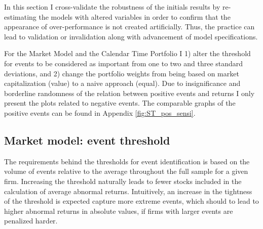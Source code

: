

In this section I cross-validate the robustness of the initials results by re-estimating the models with altered variables in order to confirm that the appearance of over-performance is not created artificially. Thus, the practice can lead to validation or invalidation along with advancement of model specifications. 

For the Market Model and the Calendar Time Portfolio I 1) alter the threshold for events to be considered as important from one to two and three standard deviations, and 2) change the portfolio weights from being based on market capitalization (value) to a naive approach (equal). Due to insignificance and borderline randomness of the relation between positive events and returns I only present the plots related to negative events. The comparable graphs of the positive events can be found in Appendix \ref{fig:ST_pos_sensi}.

\subsection{Market model: event threshold} \label{sec: sens_st_sd}

The requirements behind the thresholds for event identification is based on the volume of events relative to the average throughout the full sample for a given firm. Increasing the threshold naturally leads to fewer stocks included in the calculation of average abnormal returns. Intuitively, an increase in the tightness of the threshold is expected capture more extreme events, which should to lead to higher abnormal returns in absolute values, if firms with larger events are penalized harder.  


